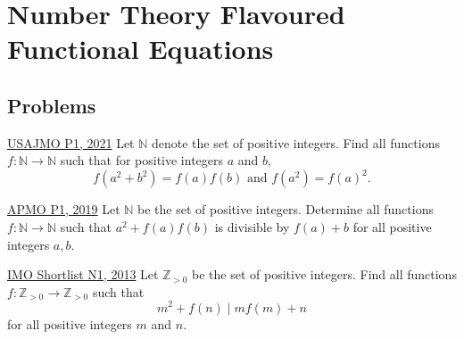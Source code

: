 \section{Number Theory Flavoured Functional Equations}
\subsection{Problems}
\begin{problem}{1}{\href{https://artofproblemsolving.com/community/q2h2529938p34791441}{USAJMO P1, 2021}}
	Let $\mathbb{N}$ denote the set of positive integers. Find all functions $f : \mathbb{N} \rightarrow \mathbb{N}$ such that for positive integers $a$ and $b,$\[f(a^2 + b^2) = f(a)f(b) \text{ and } f(a^2) = f(a)^2.\]
\end{problem}

\begin{problem}{2}{\href{https://artofproblemsolving.com/community/c6h1854148p12519631}{APMO P1, 2019}}
	Let $\mathbb{N}$ be the set of positive integers. Determine all functions $f:\mathbb{N}\to\mathbb{N}$ such that $a^2+f(a)f(b)$ is divisible by $f(a)+b$ for all positive integers $a,b$.
\end{problem}

\begin{problem}{3}{\href{https://artofproblemsolving.com/community/c6h597243p3544096}{IMO Shortlist N1, 2013}}
	Let $\mathbb{Z} _{>0}$ be the set of positive integers. Find all functions $f: \mathbb{Z} _{>0}\rightarrow \mathbb{Z} _{>0}$ such that
\[ m^2 + f(n) \mid mf(m) +n \]
for all positive integers $m$ and $n$.
\end{problem}

\newpage
